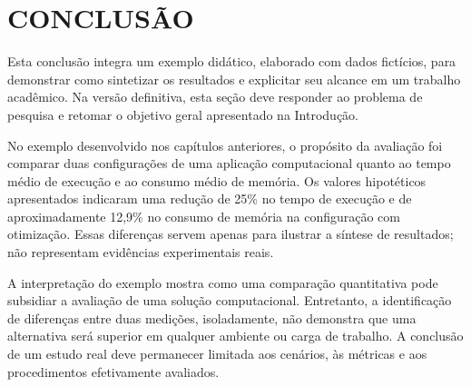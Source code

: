 

\chapter[Conclusão]{CONCLUSÃO}
\label{sec:conclusao}


Esta conclusão integra um exemplo didático, elaborado com dados fictícios, para demonstrar como sintetizar os resultados e explicitar seu alcance em um trabalho acadêmico. Na versão definitiva, esta seção deve responder ao problema de pesquisa e retomar o objetivo
geral apresentado na Introdução.

No exemplo desenvolvido nos capítulos anteriores, o propósito da avaliação foi comparar duas
configurações de uma aplicação computacional quanto ao tempo médio de execução e ao consumo médio
de memória. Os valores hipotéticos apresentados indicaram uma redução de 25\% no tempo de execução
e de aproximadamente 12,9\% no consumo de memória na configuração com otimização. Essas diferenças servem apenas para ilustrar a síntese de resultados; não representam evidências experimentais reais.

A interpretação do exemplo mostra como uma comparação quantitativa pode subsidiar a avaliação
de uma solução computacional. Entretanto, a identificação de diferenças entre duas medições,
isoladamente, não demonstra que uma alternativa será superior em qualquer ambiente ou carga de
trabalho. A conclusão de um estudo real deve permanecer limitada aos cenários, às métricas e
aos procedimentos efetivamente avaliados.

